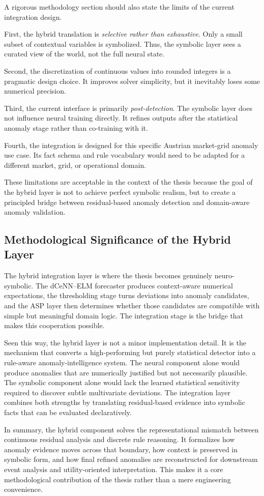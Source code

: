 A rigorous methodology section should also state the limits of the current integration design.

First, the hybrid translation is \emph{selective rather than exhaustive}. Only a small subset of contextual variables is symbolized. Thus, the symbolic layer sees a curated view of the world, not the full neural state.

Second, the discretization of continuous values into rounded integers is a pragmatic design choice. It improves solver simplicity, but it inevitably loses some numerical precision.

Third, the current interface is primarily \emph{post-detection}. The symbolic layer does not influence neural training directly. It refines outputs after the statistical anomaly stage rather than co-training with it.

Fourth, the integration is designed for this specific Austrian market-grid anomaly use case. Its fact schema and rule vocabulary would need to be adapted for a different market, grid, or operational domain.

These limitations are acceptable in the context of the thesis because the goal of the hybrid layer is not to achieve perfect symbolic realism, but to create a principled bridge between residual-based anomaly detection and domain-aware anomaly validation.

\subsection{Methodological Significance of the Hybrid Layer}

The hybrid integration layer is where the thesis becomes genuinely neuro-symbolic. The dCeNN--ELM forecaster produces context-aware numerical expectations, the thresholding stage turns deviations into anomaly candidates, and the ASP layer then determines whether those candidates are compatible with simple but meaningful domain logic. The integration stage is the bridge that makes this cooperation possible.

Seen this way, the hybrid layer is not a minor implementation detail. It is the mechanism that converts a high-performing but purely statistical detector into a rule-aware anomaly-intelligence system. The neural component alone would produce anomalies that are numerically justified but not necessarily plausible. The symbolic component alone would lack the learned statistical sensitivity required to discover subtle multivariate deviations. The integration layer combines both strengths by translating residual-based evidence into symbolic facts that can be evaluated declaratively.

In summary, the hybrid component solves the representational mismatch between continuous residual analysis and discrete rule reasoning. It formalizes how anomaly evidence moves across that boundary, how context is preserved in symbolic form, and how final refined anomalies are reconstructed for downstream event analysis and utility-oriented interpretation. This makes it a core methodological contribution of the thesis rather than a mere engineering convenience.






